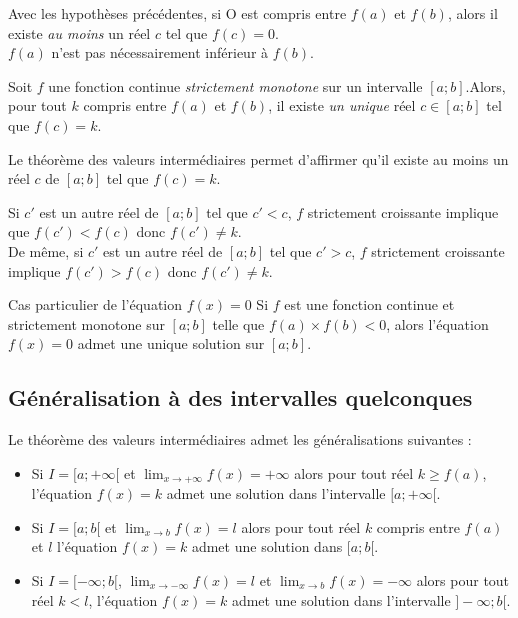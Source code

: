 \documentclass[french]{book}
\begin{document}
\begin{rem}
 Avec les hypothèses précédentes, si O est compris entre $f(a)$ et $f(b)$, alors il existe \emph{au moins} un réel $c$ tel que $f(c)=0$. \\

 $f(a)$ n'est pas nécessairement inférieur à $f(b)$.
\end{rem}


\begin{prop}
 Soit $f$ une fonction continue \emph{strictement monotone} sur un intervalle $[a;b]$.Alors, pour tout $k$ compris entre $f(a)$ et $f(b)$, il existe \emph{un unique} réel $c\in[a;b]$ tel que $f(c)=k$.
\end{prop}

\begin{demo}
 Le théorème des valeurs intermédiaires permet d'affirmer qu'il existe au moins un réel $c$ de $[a;b]$ tel que $f(c)=k$.\par
Si $c'$ est un autre réel de $[a;b]$ tel que $c'<c$, $f$ strictement croissante implique que $f(c')<f(c)$ donc $f(c')\neq k$.\\
De même, si $c'$ est un autre réel de $[a;b]$ tel que $c'>c$, $f$ strictement croissante implique $f(c')>f(c)$ donc $f(c')\neq k$.
\end{demo}

\begin{rem}{Cas particulier de l'équation $f(x)=0$}
 Si $f$ est une fonction continue et strictement monotone sur $[a;b]$ telle que $f(a)\times f(b)<0$, alors l'équation $f(x)=0$ admet une unique solution sur $[a;b]$.
\end{rem}

\subsection{Généralisation à des intervalles quelconques}

\begin{prop}
Le théorème des valeurs intermédiaires admet les généralisations suivantes :

\begin{itemize}
\item[$\bullet$] Si $I=[a;+\infty[$ et $\lim_{x\rightarrow +\infty}f(x)=+\infty$ alors pour tout réel $k\geq f(a)$, l'équation $f(x)=k$ admet une solution dans l'intervalle $[a;+\infty[$.
\item[$\bullet$] Si $I=[a;b[$ et $\lim_{x\rightarrow b}f(x)=l$ alors pour tout réel $k$ compris entre $f(a)$ et $l$ l'équation $f(x)=k$ admet une solution dans $[a;b[$.
\item[$\bullet$] Si $I=[-\infty;b[$, $\lim_{x\rightarrow -\infty}f(x)=l$ et $\lim_{x\rightarrow b}f(x)=-\infty$ alors pour tout réel $k<l$, l'équation $f(x)=k$ admet une solution dans l'intervalle $]-\infty;b[$.
\end{itemize}
\end{prop}
\end{document}
